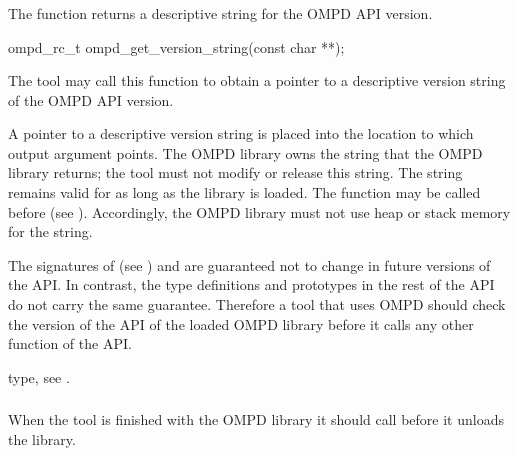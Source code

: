 \subsubsection{}
\label{subsubsubsec:ompd_get_version_string}

\summary
The  function returns a descriptive 
string for the OMPD API version.

\format
\begin{cspecific}
\begin{ompSyntax}
ompd_rc_t ompd_get_version_string(const char **);
\end{ompSyntax}
\end{cspecific}


\descr
The tool may call this function to obtain a pointer to a descriptive 
version string of the OMPD API  version.

\argdesc
A pointer to a descriptive version string is placed into the location
to which  output argument points. The OMPD library owns the string 
that the OMPD library returns; the tool must not modify or release this string.
The string remains valid for as long as the library is loaded. The
 function may be called before 
 (see ).
Accordingly, the OMPD library must not use heap or stack memory for the string.

The signatures of  (see
) and  
are guaranteed not to change in future versions of the API. In contrast, the 
type definitions and prototypes in the rest of the API do not carry the same 
guarantee. Therefore a tool that uses OMPD should check the version of the API 
of the loaded OMPD library before it calls any other function of the API.

\begin{crossrefs}
\item {} type, see .
\end{crossrefs}



\subsubsection{}
\label{subsubsubsec:ompd_finalize}

\summary
When the tool is finished with the OMPD library it should call 
 before it unloads the library.

